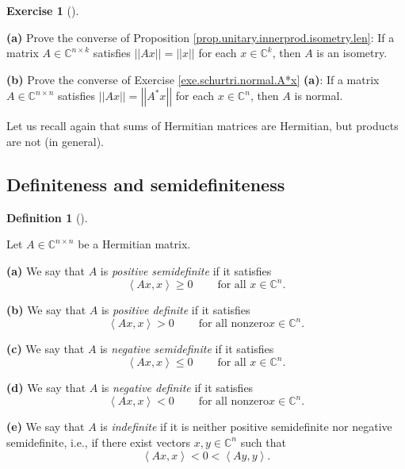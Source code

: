 \documentclass[numbers=enddot,12pt,final,onecolumn,notitlepage]{scrartcl}%
\newcounter{exer}
\numberwithin{exer}{subsection}
\theoremstyle{definition}
\newtheorem{defi}[theo]{Definition}
\newenvironment{definition}[1][]
{\begin{defi}[#1]\begin{leftbar}}
{\end{leftbar}\end{defi}}
\newtheorem{exmp}[exer]{Exercise}
\newenvironment{exercise}[1][]
{\begin{exmp}[#1]\begin{leftbar}}
{\end{leftbar}\end{exmp}}
\begin{document}
\begin{exercise}
 \textbf{(a)} Prove the converse of Proposition
\ref{prop.unitary.innerprod.isometry.len}: If a matrix $A\in\mathbb{C}%
^{n\times k}$ satisfies $\left\vert \left\vert Ax\right\vert \right\vert
=\left\vert \left\vert x\right\vert \right\vert $ for each $x\in\mathbb{C}%
^{k}$, then $A$ is an isometry. \medskip

\textbf{(b)} Prove the converse of Exercise \ref{exe.schurtri.normal.A*x}
\textbf{(a)}: If a matrix $A\in\mathbb{C}^{n\times n}$ satisfies $\left\vert
\left\vert Ax\right\vert \right\vert =\left\vert \left\vert A^{\ast
}x\right\vert \right\vert $ for each $x\in\mathbb{C}^{n}$, then $A$ is normal.
\end{exercise}

Let us recall again that sums of Hermitian matrices are Hermitian, but
products are not (in general).

\subsection{Definiteness and semidefiniteness}

\begin{definition}
Let $A\in\mathbb{C}^{n\times n}$ be a Hermitian matrix. \medskip

\textbf{(a)} We say that $A$ is \emph{positive semidefinite} if it satisfies%
\[
\left\langle Ax,x\right\rangle \geq0\ \ \ \ \ \ \ \ \ \ \text{for all }%
x\in\mathbb{C}^{n}.
\]


\textbf{(b)} We say that $A$ is \emph{positive definite} if it satisfies%
\[
\left\langle Ax,x\right\rangle >0\ \ \ \ \ \ \ \ \ \ \text{for all nonzero
}x\in\mathbb{C}^{n}.
\]


\textbf{(c)} We say that $A$ is \emph{negative semidefinite} if it satisfies%
\[
\left\langle Ax,x\right\rangle \leq0\ \ \ \ \ \ \ \ \ \ \text{for all }%
x\in\mathbb{C}^{n}.
\]


\textbf{(d)} We say that $A$ is \emph{negative definite} if it satisfies%
\[
\left\langle Ax,x\right\rangle <0\ \ \ \ \ \ \ \ \ \ \text{for all nonzero
}x\in\mathbb{C}^{n}.
\]


\textbf{(e)} We say that $A$ is \emph{indefinite} if it is neither positive
semidefinite nor negative semidefinite, i.e., if there exist vectors
$x,y\in\mathbb{C}^{n}$ such that%
\[
\left\langle Ax,x\right\rangle <0<\left\langle Ay,y\right\rangle .
\]

\end{definition}
\end{document}
